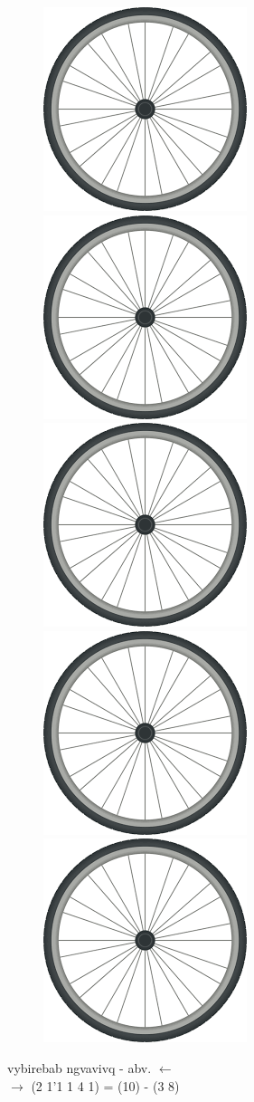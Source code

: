 \documentclass{article}
\begin{document}
\begin{center}
\begin{figure}[H]
\includegraphics[width=0.15\columnwidth]{file.png}
\includegraphics[width=0.15\columnwidth]{file.png}
\includegraphics[width=0.15\columnwidth]{file.png}
\includegraphics[width=0.15\columnwidth]{file.png}
\includegraphics[width=0.15\columnwidth]{file.png}
\end{figure}
\end{center}
\begin{center}
vybirebab ngvavivq - {\color{blue}abv.}   $\leftarrow$\\
\vspace{1cm}
$\rightarrow$  {\color{blue} (2 1'1 1 4 1) = (10)} - (3 8)
\end{center}
\end{document}
